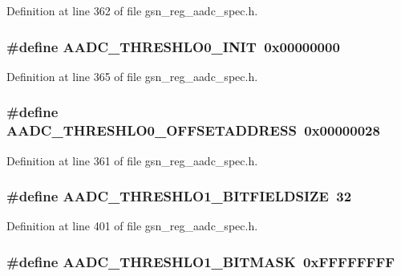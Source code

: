 Definition at line 362 of file gsn\_\-reg\_\-aadc\_\-spec.h.

\hypertarget{a00543_a18721344f960eb97230f5451a881843d}{
\subsubsection[{AADC\_\-THRESHLO0\_\-INIT}]{\setlength{\rightskip}{0pt plus 5cm}\#define AADC\_\-THRESHLO0\_\-INIT~0x00000000}}
\label{a00543_a18721344f960eb97230f5451a881843d}


Definition at line 365 of file gsn\_\-reg\_\-aadc\_\-spec.h.

\hypertarget{a00543_a80294904bd0b0caf9a873f127168317d}{
\subsubsection[{AADC\_\-THRESHLO0\_\-OFFSETADDRESS}]{\setlength{\rightskip}{0pt plus 5cm}\#define AADC\_\-THRESHLO0\_\-OFFSETADDRESS~0x00000028}}
\label{a00543_a80294904bd0b0caf9a873f127168317d}


Definition at line 361 of file gsn\_\-reg\_\-aadc\_\-spec.h.

\hypertarget{a00543_aa142535ad737256919286f1dd51f079b}{
\subsubsection[{AADC\_\-THRESHLO1\_\-BITFIELDSIZE}]{\setlength{\rightskip}{0pt plus 5cm}\#define AADC\_\-THRESHLO1\_\-BITFIELDSIZE~32}}
\label{a00543_aa142535ad737256919286f1dd51f079b}


Definition at line 401 of file gsn\_\-reg\_\-aadc\_\-spec.h.

\hypertarget{a00543_a2fb19361679f8771135d7d23a814fe4b}{
\subsubsection[{AADC\_\-THRESHLO1\_\-BITMASK}]{\setlength{\rightskip}{0pt plus 5cm}\#define AADC\_\-THRESHLO1\_\-BITMASK~0xFFFFFFFF}}
\label{a00543_a2fb19361679f8771135d7d23a814fe4b}


